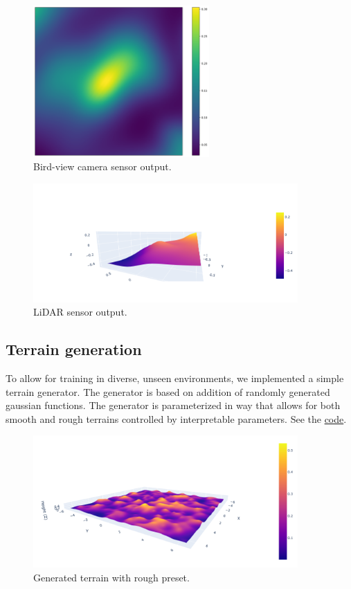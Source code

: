 \documentclass[a4paper,12pt]{article}
\begin{document}
\begin{figure}[H]
  \centering
  \includegraphics[width=0.6\textwidth]{fig/birdview_camera.png}
  \caption{Bird-view camera sensor output.}
\end{figure}
\begin{figure}[H]
  \centering
  \includegraphics[width=0.9\textwidth]{fig/pointcloud.png}
  \caption{LiDAR sensor output.}
\end{figure}

\clearpage
\subsection{Terrain generation}
To allow for training in diverse, unseen environments, we implemented a simple terrain generator. The generator is based on addition of randomly generated gaussian functions. The generator is parameterized in way that allows for both smooth and rough terrains controlled by interpretable parameters. See the \href{https://github.com/edavidk7/tracked_sim_rl/blob/d7b59702c6411e1dbda3be214524a2e22cceaac6/utils/heightmap_generators.py#L71}{code}.

\begin{figure}[H]
  \centering
  \includegraphics[width=0.9\textwidth]{fig/rough_terrain.png}
  \caption{Generated terrain with rough preset.}
\end{figure}
\end{document}
